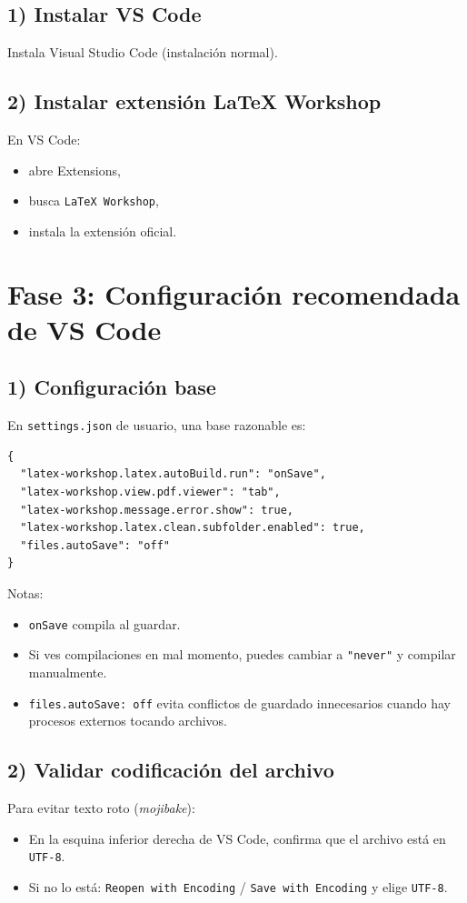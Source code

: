\documentclass[11pt]{article}
\begin{document}
\subsection{1) Instalar VS Code}
Instala Visual Studio Code (instalaci\'on normal).

\subsection{2) Instalar extensi\'on LaTeX Workshop}
En VS Code:
\begin{itemize}
  \item abre Extensions,
  \item busca \texttt{LaTeX Workshop},
  \item instala la extensi\'on oficial.
\end{itemize}

\section{Fase 3: Configuraci\'on recomendada de VS Code}
\subsection{1) Configuraci\'on base}
En \texttt{settings.json} de usuario, una base razonable es:

\begin{verbatim}
{
  "latex-workshop.latex.autoBuild.run": "onSave",
  "latex-workshop.view.pdf.viewer": "tab",
  "latex-workshop.message.error.show": true,
  "latex-workshop.latex.clean.subfolder.enabled": true,
  "files.autoSave": "off"
}
\end{verbatim}

Notas:
\begin{itemize}
  \item \texttt{onSave} compila al guardar.
  \item Si ves compilaciones en mal momento, puedes cambiar a \texttt{"never"} y compilar manualmente.
  \item \texttt{files.autoSave: off} evita conflictos de guardado innecesarios cuando hay procesos externos tocando archivos.
\end{itemize}

\subsection{2) Validar codificaci\'on del archivo}
Para evitar texto roto (\textit{mojibake}):
\begin{itemize}
  \item En la esquina inferior derecha de VS Code, confirma que el archivo est\'a en \texttt{UTF-8}.
  \item Si no lo est\'a: \texttt{Reopen with Encoding} / \texttt{Save with Encoding} y elige \texttt{UTF-8}.
\end{itemize}
\end{document}
